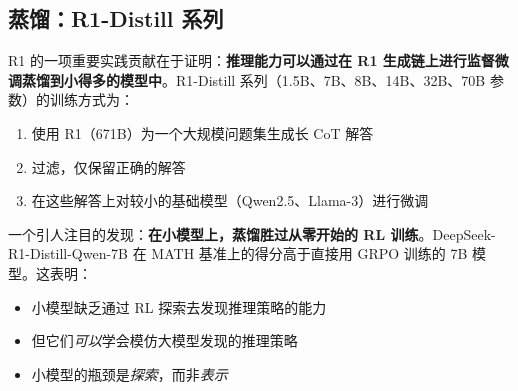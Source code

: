 \subsection{蒸馏：R1-Distill 系列}
\label{distillation-the-r1-distill-series}

R1 的一项重要实践贡献在于证明：\textbf{推理能力可以通过在 R1 生成链上进行监督微调蒸馏到小得多的模型中}。R1-Distill 系列（1.5B、7B、8B、14B、32B、70B 参数）的训练方式为：

\begin{enumerate}
  \item 使用 R1（671B）为一个大规模问题集生成长 CoT 解答
  \item 过滤，仅保留正确的解答
  \item 在这些解答上对较小的基础模型（Qwen2.5、Llama-3）进行微调
\end{enumerate}

\begin{keybox}[小模型：蒸馏 vs. RL]
一个引人注目的发现：\textbf{在小模型上，蒸馏胜过从零开始的 RL 训练}。DeepSeek-R1-Distill-Qwen-7B 在 MATH 基准上的得分高于直接用 GRPO 训练的 7B 模型。这表明：

\begin{itemize}
  \item 小模型缺乏通过 RL 探索去发现推理策略的能力
  \item 但它们\emph{可以}学会模仿大模型发现的推理策略
  \item 小模型的瓶颈是\emph{探索}，而非\emph{表示}
\end{itemize}
\end{keybox}


